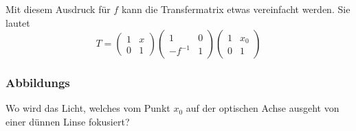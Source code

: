Mit diesem Ausdruck für $f$ kann die Transfermatrix etwas vereinfacht
werden.
Sie lautet
\begin{equation}
T
=
\begin{pmatrix}1&x\\0&1\end{pmatrix}
\begin{pmatrix}1&0\\-f^{-1}&1\end{pmatrix}
\begin{pmatrix}1&x_0\\0&1\end{pmatrix}
\label{om:fokusmatrix}
\end{equation}

\subsubsection{Abbildungs}
Wo wird das Licht, welches vom Punkt $x_0$ auf der optischen
Achse ausgeht von einer dünnen Linse fokusiert?

